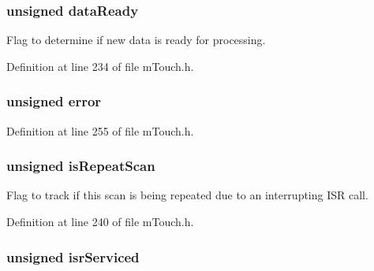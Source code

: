 \subsubsection[{data\+Ready}]{\setlength{\rightskip}{0pt plus 5cm}unsigned data\+Ready}\label{structm_touch___state_af799217cbdcc2ac20907a19c9b62a0d5}


Flag to determine if new data is ready for processing. 



Definition at line 234 of file m\+Touch.\+h.

\hypertarget{structm_touch___state_aa25790aaf38769a83aeb3bf66ba2adc3}{}
\subsubsection[{error}]{\setlength{\rightskip}{0pt plus 5cm}unsigned error}\label{structm_touch___state_aa25790aaf38769a83aeb3bf66ba2adc3}


Definition at line 255 of file m\+Touch.\+h.

\hypertarget{structm_touch___state_a815e542816b6deaf4affac094c2897d4}{}
\subsubsection[{is\+Repeat\+Scan}]{\setlength{\rightskip}{0pt plus 5cm}unsigned is\+Repeat\+Scan}\label{structm_touch___state_a815e542816b6deaf4affac094c2897d4}


Flag to track if this scan is being repeated due to an interrupting I\+S\+R call. 



Definition at line 240 of file m\+Touch.\+h.

\hypertarget{structm_touch___state_a98199bfb33a755cb711b9119e571bd7d}{}
\subsubsection[{isr\+Serviced}]{\setlength{\rightskip}{0pt plus 5cm}unsigned isr\+Serviced}\label{structm_touch___state_a98199bfb33a755cb711b9119e571bd7d}


